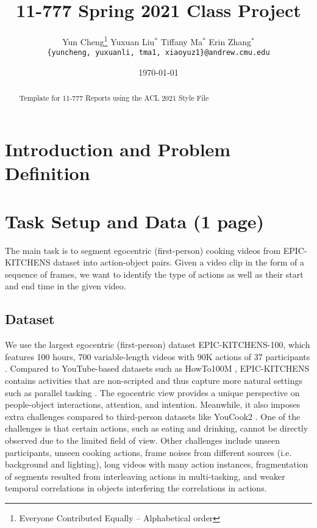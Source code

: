 \documentclass[11pt,a4paper]{article}
\title{11-777 Spring 2021 Class Project}
\author{
  Yun Cheng\thanks{\hspace{4pt}Everyone Contributed Equally -- Alphabetical order} \hspace{2em} Yuxuan Liu$^*$ \hspace{2em} Tiffany Ma$^*$ \hspace{2em} Erin Zhang$^*$ \\
  \texttt{\{yuncheng, yuxuanli, tma1, xiaoyuz1\}@andrew.cmu.edu}
}
\date{\today}
\begin{document}
\maketitle
\begin{abstract}
Template for 11-777 Reports using the ACL 2021 Style File 
\end{abstract}

\section{Introduction and Problem Definition}


\clearpage


\clearpage

\section{Task Setup and Data (1 page)}
The main task is to segment egocentric (first-person) cooking videos from EPIC-KITCHENS dataset into action-object pairs. Given a video clip in the form of a sequence of frames, we want to identify the type of actions as well as their start and end time in the given video.


\subsection{Dataset}
We use the largest egocentric (first-person) dataset  EPIC-KITCHENS-100, which features 100 hours, 700 variable-length videos with 90K actions of 37 participants \cite{Damen2020RESCALING}. Compared to YouTube-based datasets such as HowTo100M \cite{miech19howto100m}, EPIC-KITCHENS contains activities that are non-scripted and thus capture more natural settings such as parallel tasking . The egocentric view provides a unique perspective on people-object interactions, attention, and intention. Meanwhile, it also imposes extra challenges compared to third-person datasets like YouCook2 \cite{ZhXuCoAAAI18}. One of the challenges is that certain actions, such as eating and drinking, cannot be directly observed due to the limited field of view. Other challenges include unseen participants, unseen cooking actions, frame noises from different sources (i.e. background and lighting), long videos with many action instances, fragmentation of segments resulted from interleaving actions in multi-tasking, and weaker temporal correlations in objects interfering the correlations in actions.
\end{document}
